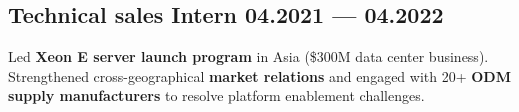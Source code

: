 \subsection{{Technical sales Intern \hfill 04.2021 --- 04.2022}}
\begin{zitemize}
\item Led \textbf{Xeon E server launch program} in Asia (\$300M data center business). Strengthened cross-geographical \textbf{market relations} and engaged with 20+ \textbf{ODM supply manufacturers} to resolve platform enablement challenges.
\end{zitemize}





